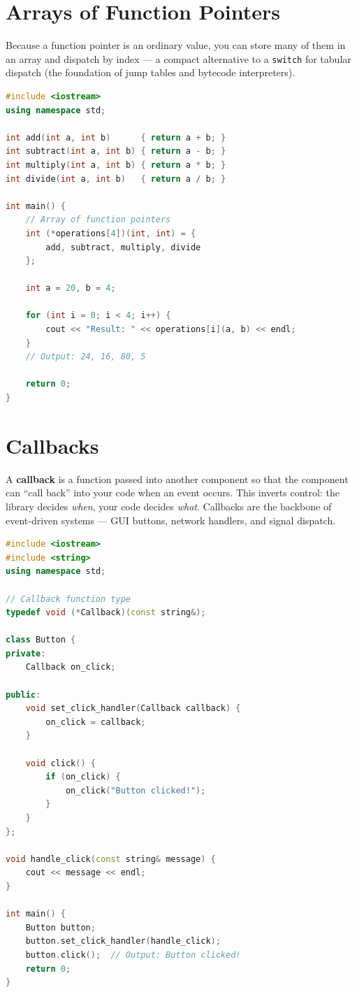 \section{Arrays of Function Pointers}
\label{sec:function-pointer-arrays}

Because a function pointer is an ordinary value, you can store many of them in an array and dispatch by index --- a compact alternative to a \texttt{switch} for tabular dispatch (the foundation of jump tables and bytecode interpreters).

\begin{lstlisting}[language=C++, caption={An array of function pointers as a dispatch table}]
#include <iostream>
using namespace std;

int add(int a, int b)      { return a + b; }
int subtract(int a, int b) { return a - b; }
int multiply(int a, int b) { return a * b; }
int divide(int a, int b)   { return a / b; }

int main() {
    // Array of function pointers
    int (*operations[4])(int, int) = {
        add, subtract, multiply, divide
    };

    int a = 20, b = 4;

    for (int i = 0; i < 4; i++) {
        cout << "Result: " << operations[i](a, b) << endl;
    }
    // Output: 24, 16, 80, 5

    return 0;
}
\end{lstlisting}

\section{Callbacks}
\label{sec:callbacks}

A \textbf{callback} is a function passed into another component so that the component can ``call back'' into your code when an event occurs. This inverts control: the library decides \textit{when}, your code decides \textit{what}. Callbacks are the backbone of event-driven systems --- GUI buttons, network handlers, and signal dispatch.

\begin{lstlisting}[language=C++, caption={A callback-driven Button}]
#include <iostream>
#include <string>
using namespace std;

// Callback function type
typedef void (*Callback)(const string&);

class Button {
private:
    Callback on_click;

public:
    void set_click_handler(Callback callback) {
        on_click = callback;
    }

    void click() {
        if (on_click) {
            on_click("Button clicked!");
        }
    }
};

void handle_click(const string& message) {
    cout << message << endl;
}

int main() {
    Button button;
    button.set_click_handler(handle_click);
    button.click();  // Output: Button clicked!
    return 0;
}
\end{lstlisting}

